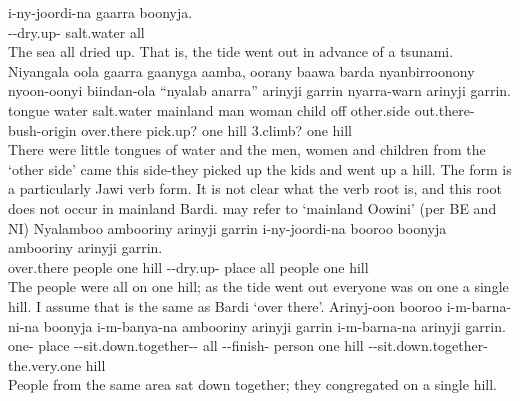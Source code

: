 \setcounter{exxy}{0}\begin{exye}
\exy {}
\gll i-ny-joordi-na gaarra boonyja.\\
--dry.up- salt.water all\\
\ft The sea all dried up.
\nt That is, the tide went out in advance of a tsunami.
\exy {}
\gll Niyangala oola gaarra gaanyga aamba, oorany baawa barda nyanbirroonony nyoon-oonyi biindan-ola ``nyalab anarra'' arinyji garrin nyarra-warn arinyji garrin.\\
tongue water salt.water mainland man woman child off other.side out.there- bush-origin over.there pick.up? one hill 3.climb? one hill\\
\ft There were little tongues of water and the men, women and children from the `other side' came this side-they picked up the kids and went up a hill.
\nt The form  is a particularly Jawi verb form. It is not clear what the verb root is, and this root does not occur in mainland Bardi.
\nt {} may refer to `mainland Oowini' (per BE and NI)
\exy {}
\gll Nyalamboo ambooriny arinyji garrin i-ny-joordi-na booroo boonyja ambooriny arinyji garrin.\\
over.there people one hill --dry.up- place all people one hill\\
\ft The people were all on one hill; as the tide went out everyone was on one a single hill.
\nt I assume that  is the same as Bardi  `over there'.
\exy {}
\gll Arinyj-oon booroo i-m-barna-ni-na boonyja i-m-banya-na ambooriny arinyji garrin i-m-barna-na arinyji garrin.\\
one- place --sit.down.together-- all --finish- person one hill --sit.down.together- the.very.one hill\\
\ft People from the same area sat down together; they congregated on a single hill.

\end{exye}
